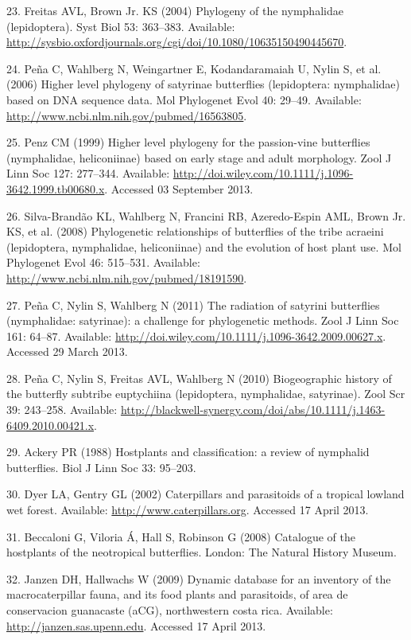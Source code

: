\documentclass[10pt]{article}
\begin{document}
23. Freitas AVL, Brown Jr. KS (2004) Phylogeny of the nymphalidae
(lepidoptera). Syst Biol 53: 363--383. Available:
\url{http://sysbio.oxfordjournals.org/cgi/doi/10.1080/10635150490445670}.

24. Peña C, Wahlberg N, Weingartner E, Kodandaramaiah U, Nylin S, et al.
(2006) Higher level phylogeny of satyrinae butterflies (lepidoptera:
nymphalidae) based on DNA sequence data. Mol Phylogenet Evol 40: 29--49.
Available: \url{http://www.ncbi.nlm.nih.gov/pubmed/16563805}.

25. Penz CM (1999) Higher level phylogeny for the passion-vine
butterflies (nymphalidae, heliconiinae) based on early stage and adult
morphology. Zool J Linn Soc 127: 277--344. Available:
\url{http://doi.wiley.com/10.1111/j.1096-3642.1999.tb00680.x}. Accessed
03 September 2013.

26. Silva-Brandão KL, Wahlberg N, Francini RB, Azeredo-Espin AML, Brown
Jr. KS, et al. (2008) Phylogenetic relationships of butterflies of the
tribe acraeini (lepidoptera, nymphalidae, heliconiinae) and the
evolution of host plant use. Mol Phylogenet Evol 46: 515--531.
Available: \url{http://www.ncbi.nlm.nih.gov/pubmed/18191590}.

27. Peña C, Nylin S, Wahlberg N (2011) The radiation of satyrini
butterflies (nymphalidae: satyrinae): a challenge for phylogenetic
methods. Zool J Linn Soc 161: 64--87. Available:
\url{http://doi.wiley.com/10.1111/j.1096-3642.2009.00627.x}. Accessed 29
March 2013.

28. Peña C, Nylin S, Freitas AVL, Wahlberg N (2010) Biogeographic
history of the butterfly subtribe euptychiina (lepidoptera, nymphalidae,
satyrinae). Zool Scr 39: 243--258. Available:
\url{http://blackwell-synergy.com/doi/abs/10.1111/j.1463-6409.2010.00421.x}.

29. Ackery PR (1988) Hostplants and classification: a review of
nymphalid butterflies. Biol J Linn Soc 33: 95--203.

30. Dyer LA, Gentry GL (2002) Caterpillars and parasitoids of a tropical
lowland wet forest. Available: \url{http://www.caterpillars.org}.
Accessed 17 April 2013.

31. Beccaloni G, Viloria Á, Hall S, Robinson G (2008) Catalogue of the
hostplants of the neotropical butterflies. London: The Natural History
Museum.

32. Janzen DH, Hallwachs W (2009) Dynamic database for an inventory of
the macrocaterpillar fauna, and its food plants and parasitoids, of area
de conservacion guanacaste (aCG), northwestern costa rica. Available:
\url{http://janzen.sas.upenn.edu}. Accessed 17 April 2013.
\end{document}
